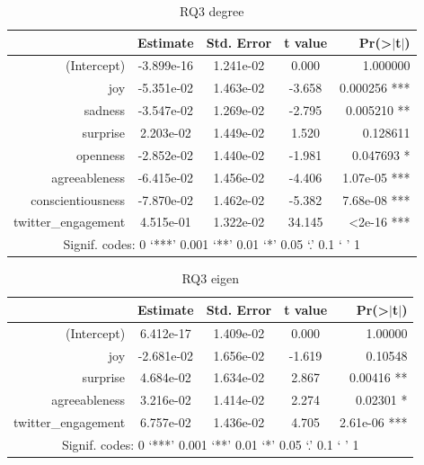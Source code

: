 \documentclass[bsc,frontabs,twoside,singlespacing,parskip,deptreport]{infthesis}
\begin{document}
\begin{table}[]
\centering
\caption{RQ3 degree}
\label{tab:rq3-degree}
\begin{tabular}{rcccr}
\hline
                    & Estimate  & Std. Error     & t value & Pr(\textgreater{}$\rvert$t$\rvert$) \\ \hline
(Intercept)         & -3.899e-16    & 1.241e-02 & 0.000   & 1.000000                            \\
joy                 & -5.351e-02    & 1.463e-02 & -3.658  & 0.000256 ***                        \\
sadness             & -3.547e-02    & 1.269e-02 & -2.795  & 0.005210 **                         \\
surprise            & 2.203e-02     & 1.449e-02 & 1.520   & 0.128611                            \\
openness            & -2.852e-02    & 1.440e-02 & -1.981  & 0.047693 *                          \\
agreeableness       & -6.415e-02    & 1.456e-02 & -4.406  & 1.07e-05 ***                        \\
conscientiousness   & -7.870e-02    & 1.462e-02 & -5.382  & 7.68e-08 ***                        \\
twitter\_engagement & 4.515e-01     & 1.322e-02 & 34.145  & \textless 2e-16 ***                 \\ \hline
\multicolumn{5}{c}{Signif. codes:  0 ‘***’ 0.001 ‘**’ 0.01 ‘*’ 0.05 ‘.’ 0.1 ‘ ’ 1}              \\ \hline
\end{tabular}
\end{table}

\begin{table}[]
\centering
\caption{RQ3 eigen}
\label{tab:rq3-eigen}
\begin{tabular}{rcccr}
\hline
                    & Estimate  & Std. Error     & t value & Pr(\textgreater{}$\rvert$t$\rvert$) \\ \hline
(Intercept)         & 6.412e-17     & 1.409e-02 & 0.000   & 1.00000                             \\
joy                 & -2.681e-02    & 1.656e-02 & -1.619  & 0.10548                             \\
surprise            & 4.684e-02     & 1.634e-02 & 2.867   & 0.00416 **                          \\
agreeableness       & 3.216e-02     & 1.414e-02 & 2.274   & 0.02301 *                           \\
twitter\_engagement & 6.757e-02     & 1.436e-02 & 4.705   & 2.61e-06 ***                        \\ \hline
\multicolumn{5}{c}{Signif. codes:  0 ‘***’ 0.001 ‘**’ 0.01 ‘*’ 0.05 ‘.’ 0.1 ‘ ’ 1}              \\ \hline
\end{tabular}
\end{table}
\end{document}
